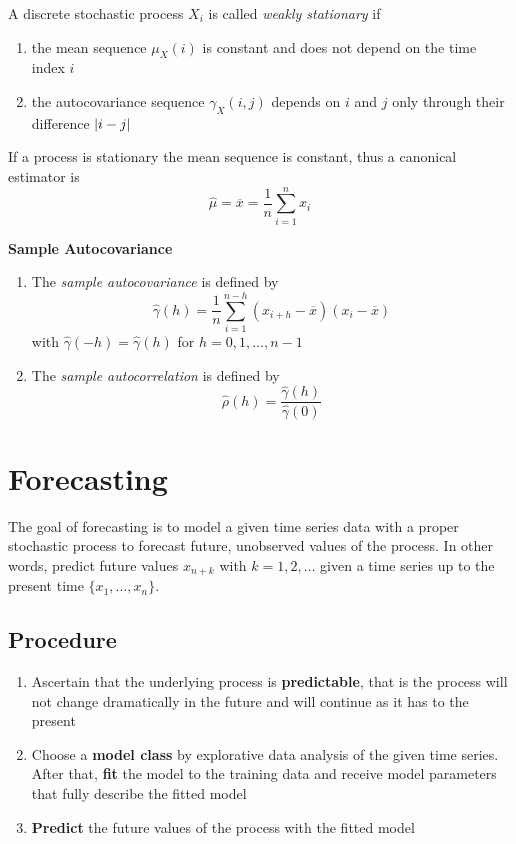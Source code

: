 \documentclass[11pt]{article}
\theoremstyle{definition}
\newcommand*\samplemean[1]{\overline{#1}}
\DeclarePairedDelimiter\abs{\lvert}{\rvert}
\begin{document}
\begin{definition}
	A discrete stochastic process $X_i$ is called \emph{weakly stationary} if
	\begin{enumerate}
		\item the mean sequence $\mu_X(i)$ is constant and does not depend on the time index $i$
		\item the autocovariance sequence $\gamma_X(i,j)$ depends on $i$ and $j$ only through their difference $\abs{i-j}$
	\end{enumerate}
\end{definition}

If a process is stationary the mean sequence is constant, thus a canonical estimator is
\begin{equation*}
	\hat{\mu} = \samplemean{x} = \frac{1}{n}\sum_{i=1}^n x_i
\end{equation*}
\begin{definition}
	\textbf{Sample Autocovariance}
	\begin{enumerate}
		\item The \emph{sample autocovariance} is defined by
		\begin{equation*}
			\hat{\gamma}(h) = \frac{1}{n}\sum_{i=1}^{n-h}(x_{i+h}-\samplemean{x})(x_i - \samplemean{x})
		\end{equation*}
		with $\hat{\gamma}(-h) =\hat{\gamma}(h)$ for $h=0,1,\dots,n-1$
		\item The \emph{sample autocorrelation} is defined by
		\begin{equation*}
			\hat{\rho}(h) = \frac{\hat{\gamma}(h)}{\hat{\gamma}(0)}
		\end{equation*}
	\end{enumerate}
\end{definition}

\section{Forecasting}

The goal of forecasting is to model a given time series data with a proper stochastic process to forecast future, unobserved values of the process. In other words, predict future values $x_{n+k}$ with $k=1,2,\dots$ given a time series up to the present time $\{x_1,\dots,x_n\}$.

\subsection{Procedure}
\begin{enumerate}
	\item Ascertain that the underlying process is \textbf{predictable}, that is the process will not change dramatically in the future and will continue as it has to the present
	\item Choose a \textbf{model class} by explorative data analysis of the given time series. After that, \textbf{fit} the model to the training data and receive model parameters that fully describe the fitted model
	\item \textbf{Predict} the future values of the process with the fitted model
\end{enumerate}
\end{document}
